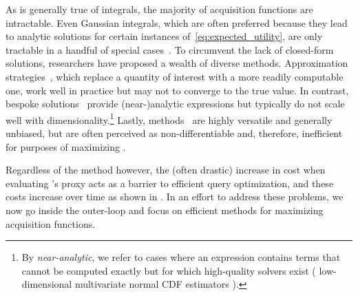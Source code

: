 As is generally true of integrals, the majority of acquisition functions are intractable. 
% 
Even Gaussian integrals, which are often preferred because they lead to analytic solutions for certain instances of~\eqref{eq:expected_utility}, are only tractable in a handful of special cases~\cite{genz92numerical,gassmann02,cunningham2011epmgp}.
% 
To circumvent the lack of closed-form solutions, researchers have proposed a wealth of diverse methods. 
% 
Approximation strategies~\cite{cunningham2011epmgp, desautels2014parallelizing, wang2017max}, which replace a quantity of interest with a more readily computable one, work well in practice but may not to converge to the true value.  
% 
In contrast, bespoke solutions~\cite{genz92numerical, ginsbourger2010kriging, chevalier2013fast} provide \mbox{(near-)}analytic expressions but typically do not scale well with dimensionality.\footnote{By \emph{near-analytic}, we refer to cases where an expression contains terms that cannot be computed exactly but for which high-quality solvers exist (\eg{} low-dimensional multivariate normal CDF estimators \cite{genz92numerical,genz2004numerical}).} 
% 
Lastly, \MC methods~\cite{osborne2009gaussian,snoek-nips12a,hennig-jmlr12a} are highly versatile and generally unbiased, but are often perceived as non-differentiable and, therefore, inefficient for purposes of maximizing \Acq{}. 
% 

Regardless of the method however, the (often drastic) increase in cost when evaluating \Acq's proxy acts as a barrier to efficient query optimization, and these costs increase over time as shown in .
% 
In an effort to address these problems, we now go inside the outer-loop and focus on efficient methods for maximizing acquisition functions.
